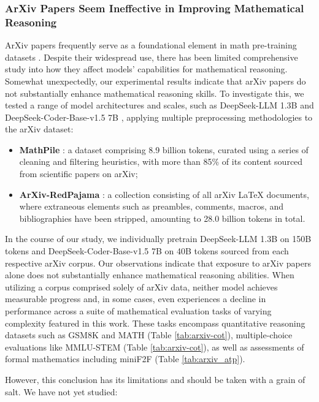 \begin{itemize}[topsep=0pt]
\begin{itemize}[topsep=0pt]
\subsubsection{ArXiv Papers Seem Ineffective in Improving Mathematical Reasoning}

ArXiv papers frequently serve as a foundational element in math pre-training datasets \citep{minerva,gpt-f,llemma,mathpile}. Despite their widespread use, there has been limited comprehensive study into how they affect models' capabilities for mathematical reasoning. Somewhat unexpectedly, our experimental results indicate that arXiv papers do not substantially enhance mathematical reasoning skills. To investigate this, we tested a range of model architectures and scales, such as DeepSeek-LLM 1.3B and DeepSeek-Coder-Base-v1.5 7B \citep{deepseek-coder}, applying multiple preprocessing methodologies to the arXiv dataset:

\begin{itemize}[topsep=0pt]
    \item \textbf{MathPile} \citep{mathpile}: a dataset comprising 8.9 billion tokens, curated using a series of cleaning and filtering heuristics, with more than 85\% of its content sourced from scientific papers on arXiv;
    \item \textbf{ArXiv-RedPajama} \citep{redpajama}: a collection consisting of all arXiv LaTeX documents, where extraneous elements such as preambles, comments, macros, and bibliographies have been stripped, amounting to 28.0 billion tokens in total.
\end{itemize}

In the course of our study, we individually pretrain DeepSeek-LLM 1.3B on 150B tokens and DeepSeek-Coder-Base-v1.5 7B on 40B tokens sourced from each respective arXiv corpus. Our observations indicate that exposure to arXiv papers alone does not substantially enhance mathematical reasoning abilities. When utilizing a corpus comprised solely of arXiv data, neither model achieves measurable progress and, in some cases, even experiences a decline in performance across a suite of mathematical evaluation tasks of varying complexity featured in this work. These tasks encompass quantitative reasoning datasets such as GSM8K and MATH (Table \ref{tab:arxiv-cot}), multiple-choice evaluations like MMLU-STEM (Table \ref{tab:arxiv-cot}), as well as assessments of formal mathematics including miniF2F (Table \ref{tab:arxiv_atp}).

However, this conclusion has its limitations and should be taken with a grain of salt. We have not yet studied:


\end{itemize}
\end{itemize}
